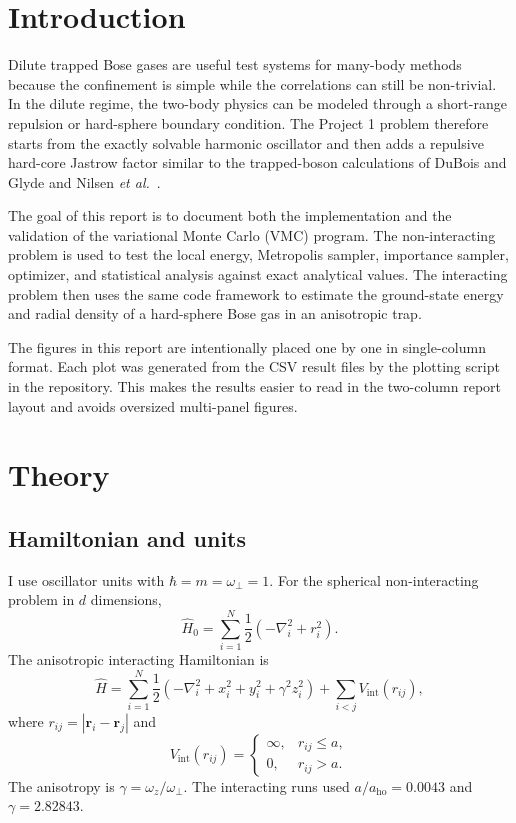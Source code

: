 \documentclass[10pt,a4paper]{article}
\newcommand{\br}{\mathbf{r}}
\begin{document}
\section{Introduction}

Dilute trapped Bose gases are useful test systems for many-body methods because the confinement is simple while the correlations can still be non-trivial. In the dilute regime, the two-body physics can be modeled through a short-range repulsion or hard-sphere boundary condition. The Project 1 problem therefore starts from the exactly solvable harmonic oscillator and then adds a repulsive hard-core Jastrow factor similar to the trapped-boson calculations of DuBois and Glyde \cite{dubois2001} and Nilsen \emph{et al.}\ \cite{nilsen2005}.

The goal of this report is to document both the implementation and the validation of the variational Monte Carlo (VMC) program. The non-interacting problem is used to test the local energy, Metropolis sampler, importance sampler, optimizer, and statistical analysis against exact analytical values. The interacting problem then uses the same code framework to estimate the ground-state energy and radial density of a hard-sphere Bose gas in an anisotropic trap.

The figures in this report are intentionally placed one by one in single-column format. Each plot was generated from the CSV result files by the plotting script in the repository. This makes the results easier to read in the two-column report layout and avoids oversized multi-panel figures.

\section{Theory}\label{sec:theory}

\subsection{Hamiltonian and units}

I use oscillator units with $\hbar=m=\omega_{\perp}=1$. For the spherical non-interacting problem in $d$ dimensions,
\begin{equation}
    \hat{H}_0=\sum_{i=1}^{N}\frac{1}{2}\left(-\nabla_i^2+r_i^2\right).
    \label{eq:hamiltonian-spherical}
\end{equation}
The anisotropic interacting Hamiltonian is
\begin{equation}
    \hat{H}=\sum_{i=1}^{N}\frac{1}{2}\left(-\nabla_i^2+x_i^2+y_i^2+\gamma^2z_i^2\right)
    +\sum_{i<j}V_{\mathrm{int}}(r_{ij}),
    \label{eq:hamiltonian-interacting}
\end{equation}
where $r_{ij}=|\br_i-\br_j|$ and
\begin{equation}
    V_{\mathrm{int}}(r_{ij})=
    \begin{cases}
    \infty, & r_{ij}\le a,\\
    0, & r_{ij}>a.
    \end{cases}
    \label{eq:hard-core}
\end{equation}
The anisotropy is $\gamma=\omega_z/\omega_{\perp}$. The interacting runs used $a/a_{\mathrm{ho}}=0.0043$ and $\gamma=2.82843$.
\end{document}
